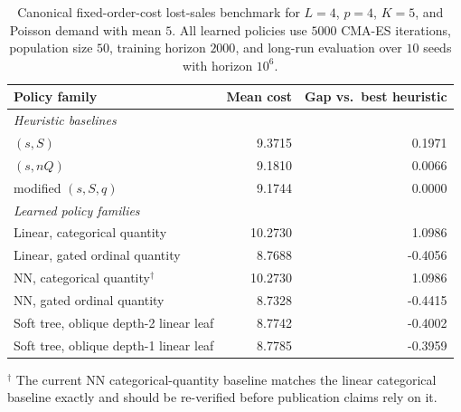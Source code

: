 \begin{table}[!htbp]
\centering
\caption{Canonical fixed-order-cost lost-sales benchmark for $L=4$, $p=4$, $K=5$, and Poisson demand with mean $5$. All learned policies use $5000$ CMA-ES iterations, population size $50$, training horizon $2000$, and long-run evaluation over $10$ seeds with horizon $10^6$.}
\label{tab:fixed-cost-canonical}
\begin{tabular}{lrr}
\toprule
Policy family & Mean cost & Gap vs.\ best heuristic \\
\midrule
\multicolumn{3}{l}{\textit{Heuristic baselines}} \\
$(s,S)$ & 9.3715 & 0.1971 \\
$(s,nQ)$ & 9.1810 & 0.0066 \\
modified $(s,S,q)$ & 9.1744 & 0.0000 \\
\midrule
\multicolumn{3}{l}{\textit{Learned policy families}} \\
Linear, categorical quantity & 10.2730 & 1.0986 \\
Linear, gated ordinal quantity & 8.7688 & -0.4056 \\
NN, categorical quantity$^{\dagger}$ & 10.2730 & 1.0986 \\
NN, gated ordinal quantity & 8.7328 & -0.4415 \\
Soft tree, oblique depth-2 linear leaf & 8.7742 & -0.4002 \\
Soft tree, oblique depth-1 linear leaf & 8.7785 & -0.3959 \\
\bottomrule
\end{tabular}
\par\medskip\footnotesize{$^{\dagger}$ The current NN categorical-quantity baseline matches the linear categorical baseline exactly and should be re-verified before publication claims rely on it.}
\end{table}
